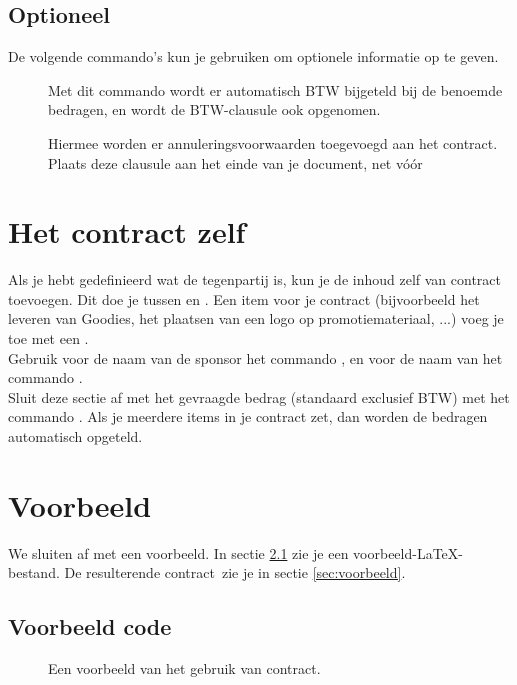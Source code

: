 \documentclass[a4paper]{article}
\newcommand\classnaam{contract}%
\newcommand\classsf{\textsf{\classnaam}}
\newcommand\funktie{contract}%
\begin{document}
\subsection{Optioneel}

De volgende commando's kun je gebruiken om optionele informatie op te geven.

\begin{description}
\item[] Met dit commando wordt er automatisch BTW bijgeteld bij de benoemde bedragen, en wordt de BTW-clausule ook opgenomen.
\item[] Hiermee worden er annuleringsvoorwaarden toegevoegd aan het contract. Plaats deze clausule aan het einde van je document, net v\'o\'or 
\end{description}

\section{Het contract zelf}\label{sec:handleiding}

Als je hebt gedefinieerd wat de tegenpartij is, kun je de inhoud zelf van contract toevoegen. Dit doe je tussen  en .
Een item voor je contract (bijvoorbeeld het leveren van Goodies, het plaatsen van een logo op promotiemateriaal, ...) voeg je toe met een .\\

Gebruik voor de naam van de sponsor het commando , en voor de naam van \aesnaam het commando .\\

Sluit deze sectie af met het gevraagde bedrag (standaard exclusief BTW) met het commando .
Als je meerdere items in je contract zet, dan worden de bedragen automatisch opgeteld.

\section{Voorbeeld}

We sluiten af met een voorbeeld.
In sectie \ref{sec:code} zie je een voorbeeld-\LaTeX-bestand. De resulterende \funktie \ zie je in sectie \ref{sec:voorbeeld}.

\clearpage
\subsection{Voorbeeld code}\label{sec:code}
\begin{figure}[ht]
\caption{Een voorbeeld van het gebruik van \classsf.}
\label{fig:code}
\end{figure}

\clearpage
 

\end{document}
